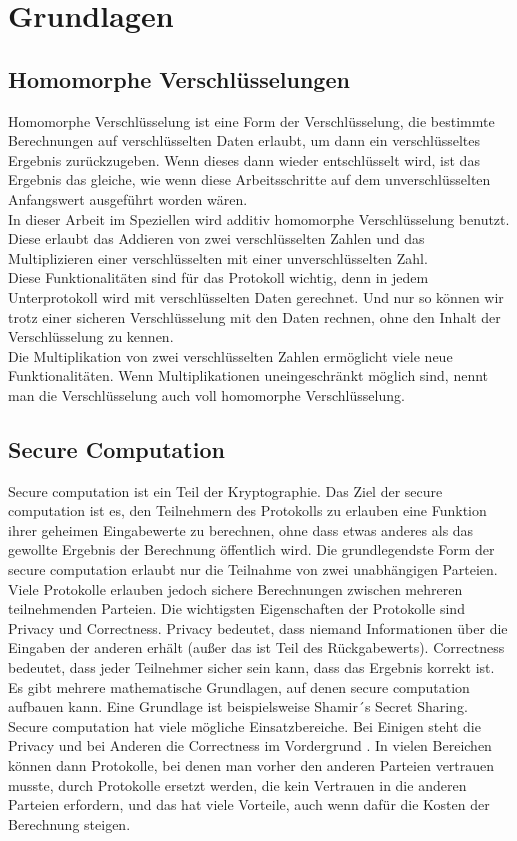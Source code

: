 \chapter{Grundlagen}


\section{Homomorphe Verschlüsselungen}
Homomorphe Verschlüsselung ist eine Form der Verschlüsselung, die bestimmte Berechnungen auf verschlüsselten Daten erlaubt, um dann ein verschlüsseltes Ergebnis zurückzugeben. Wenn dieses dann wieder entschlüsselt wird, ist das Ergebnis das gleiche, wie wenn diese Arbeitsschritte auf dem unverschlüsselten Anfangswert ausgeführt worden wären. \cite{Yi2014} \\
In dieser Arbeit im Speziellen wird additiv homomorphe Verschlüsselung benutzt. Diese  erlaubt das Addieren von zwei verschlüsselten Zahlen und das Multiplizieren einer verschlüsselten mit einer unverschlüsselten Zahl.\\
Diese Funktionalitäten sind für das Protokoll wichtig, denn in jedem Unterprotokoll wird mit verschlüsselten Daten gerechnet. Und nur so können wir trotz einer sicheren Verschlüsselung mit den Daten rechnen, ohne den Inhalt der Verschlüsselung zu kennen.\\
Die Multiplikation von zwei verschlüsselten Zahlen ermöglicht viele neue Funktionalitäten. Wenn Multiplikationen uneingeschränkt möglich sind, nennt man die Verschlüsselung auch voll homomorphe Verschlüsselung.


\section{Secure Computation}
Secure computation ist ein Teil der Kryptographie. Das Ziel der secure computation ist es, den Teilnehmern des Protokolls zu erlauben eine Funktion ihrer geheimen Eingabewerte zu berechnen, ohne dass etwas anderes als das gewollte Ergebnis der Berechnung öffentlich wird. \cite{cryptoeprint:2020:300} Die grundlegendste Form der secure computation erlaubt nur die Teilnahme von zwei unabhängigen Parteien. Viele Protokolle erlauben jedoch sichere Berechnungen zwischen mehreren teilnehmenden Parteien. Die wichtigsten Eigenschaften der Protokolle sind Privacy und Correctness. Privacy bedeutet, dass niemand Informationen über die Eingaben der anderen erhält (außer das ist Teil des Rückgabewerts). Correctness bedeutet, dass jeder Teilnehmer sicher sein kann, dass das Ergebnis korrekt ist. \cite{cryptoeprint:2020:300} Es gibt mehrere mathematische Grundlagen, auf denen secure computation aufbauen kann. Eine Grundlage ist beispielsweise Shamir´s Secret Sharing. Secure computation hat viele mögliche Einsatzbereiche. Bei Einigen steht die Privacy und bei Anderen die Correctness im Vordergrund \cite{cryptoeprint:2020:300}. In vielen Bereichen können dann Protokolle, bei denen man vorher den anderen Parteien vertrauen musste, durch Protokolle ersetzt werden, die kein Vertrauen in die anderen Parteien erfordern, und das hat viele Vorteile, auch wenn dafür die Kosten der Berechnung steigen.